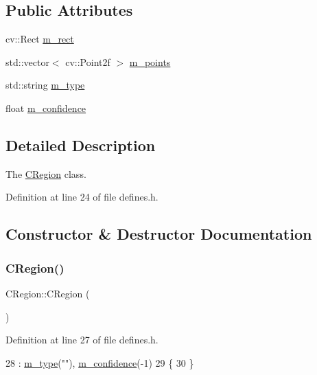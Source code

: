 \subsection*{Public Attributes}
\begin{DoxyCompactItemize}
\item 
cv\+::\+Rect \mbox{\hyperlink{class_c_region_a6f68304e90428db829cc38792fa3e1e8}{m\+\_\+rect}}
\item 
std\+::vector$<$ cv\+::\+Point2f $>$ \mbox{\hyperlink{class_c_region_a65be08ae81a8d174d95ae35a2f7fb212}{m\+\_\+points}}
\item 
std\+::string \mbox{\hyperlink{class_c_region_a287bf43ffa4837595762cbb007459a9a}{m\+\_\+type}}
\item 
float \mbox{\hyperlink{class_c_region_a349d846f135edc49a4c8f2db994b84b8}{m\+\_\+confidence}}
\end{DoxyCompactItemize}


\subsection{Detailed Description}
The \mbox{\hyperlink{class_c_region}{C\+Region}} class. 

Definition at line 24 of file defines.\+h.



\subsection{Constructor \& Destructor Documentation}
\mbox{\label{class_c_region_a5f0eb7708629986b33543c3859ce782a}} 
\subsubsection{\texorpdfstring{C\+Region()}{CRegion()}\hspace{0.1cm}{\footnotesize\ttfamily [1/3]}}
{\footnotesize\ttfamily C\+Region\+::\+C\+Region (\begin{DoxyParamCaption}{ }\end{DoxyParamCaption})\hspace{0.3cm}{\ttfamily [inline]}}



Definition at line 27 of file defines.\+h.


\begin{DoxyCode}
28         : \mbox{\hyperlink{class_c_region_a287bf43ffa4837595762cbb007459a9a}{m\_type}}(\textcolor{stringliteral}{""}), \mbox{\hyperlink{class_c_region_a349d846f135edc49a4c8f2db994b84b8}{m\_confidence}}(-1)
29     \{
30     \}
\end{DoxyCode}
\mbox{\label{class_c_region_a5d052268a9412b514430f60c32765618}} 
